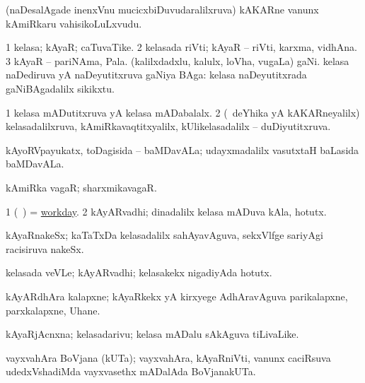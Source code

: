 \begin{center}
\bentry
{} 
\gl{\nA}
\expl{}
\bmng
(naDesalAgade inenxVnu mucicxbiDuvudaralilxruva) kAKARne \mo vanunx kAmiRkaru vahisikoLuLxvudu. 
\emng
\eentry

\bentry
{} 
\gl{\nA}
\expl{}
\bmng
\bnum
\num{1} kelasa; kAyaR; caTuvaTike. 
\num{2} kelasada riVti; kAyaR -- riVti, karxma, vidhAna. 
\num{3} kAyaR -- pariNAma, Pala. 
\banum
{} (kalilxdadxlu, kalulx, loVha, \mo vugaLa) gaNi. 
 kelasa naDediruva yA naDeyutitxruva gaNiya BAga:  kelasa naDeyutitxrada gaNiBAgadalilx sikikxtu. 
\eanum
\numie
\enum
\emng
\eentry

\bentry
{} 
\gl{\gu}
\expl{}
\bmng
\bnum
\num{1} kelasa mADutitxruva yA kelasa mADabalalx. 
\num{2} (\kanmu\ deYhika yA kAKARneyalilx) kelasadalilxruva, kAmiRkavaqtitxyalilx, kUlikelasadalilx -- duDiyutitxruva. 
\enum
\emng
\eentry

\bentry
{} 
\gl{\nA}
\expl{}
\bmng
kAyoRVpayukatx, toDagisida -- baMDavALa; udayxmadalilx vasutxtaH baLasida baMDavALa. 
\emng
\eentry

\bentry
{} 
\gl{\nA}
\expl{}
\bmng
kAmiRka vagaR; sharxmikavagaR. 
\emng
\eentry

\bentry
{} 
\gl{\nA}
\expl{}
\bmng
\bnum
\num{1} (\kanmu\ \birx) = \hyperlink{workday}{workday}. 
\num{2} kAyARvadhi; dinadalilx kelasa mADuva kAla, hotutx. 
\enum
\emng
\eentry

\bentry
{} 
\gl{\nA}
\expl{}
\bmng
kAyaRnakeSx; kaTaTxDa kelasadalilx sahAyavAguva, sekxVlfge sariyAgi racisiruva nakeSx. 
\emng
\eentry

\bentry
{} 
\gl{\nA}
\expl{}
\bmng
kelasada veVLe; kAyARvadhi; kelasakekx nigadiyAda hotutx. 
\emng
\eentry

\bentry
{} 
\gl{\nA}
\expl{}
\bmng
kAyARdhAra kalapxne; kAyaRkekx yA kirxyege AdhAravAguva parikalapxne, parxkalapxne, Uhane. 
\emng
\eentry

\bentry
{} 
\gl{\nA}
\expl{}
\bmng
kAyaRjAcnxna; kelasadarivu; kelasa mADalu sAkAguva tiLivaLike. 
\emng
\eentry

\bentry
{} 
\gl{\nA}
\expl{}
\bmng
vayxvahAra BoVjana (kUTa); vayxvahAra, kAyaRniVti, \mo vanunx caciRsuva udedxVshadiMda vayxvasethx mADalAda BoVjanakUTa. 
\emng
\eentry


\end{center}
